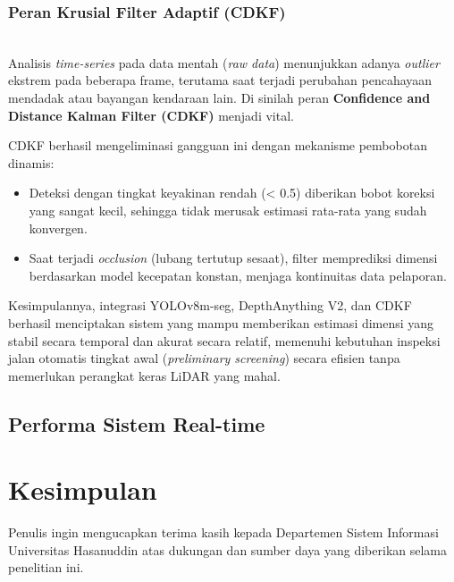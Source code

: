 \documentclass{iopjournal}
\begin{document}
\subsubsection{Peran Krusial Filter Adaptif (CDKF)}
\mbox{}\\
Analisis \textit{time-series} pada data mentah (\textit{raw data}) menunjukkan adanya \textit{outlier} ekstrem pada beberapa frame, terutama saat terjadi perubahan pencahayaan mendadak atau bayangan kendaraan lain. Di sinilah peran \textbf{Confidence and Distance Kalman Filter (CDKF)} menjadi vital.

CDKF berhasil mengeliminasi gangguan ini dengan mekanisme pembobotan dinamis:
\begin{itemize}
    \item Deteksi dengan tingkat keyakinan rendah (< 0.5) diberikan bobot koreksi yang sangat kecil, sehingga tidak merusak estimasi rata-rata yang sudah konvergen.
    \item Saat terjadi \textit{occlusion} (lubang tertutup sesaat), filter memprediksi dimensi berdasarkan model kecepatan konstan, menjaga kontinuitas data pelaporan.
\end{itemize}

Kesimpulannya, integrasi YOLOv8m-seg, DepthAnything V2, dan CDKF berhasil menciptakan sistem yang mampu memberikan estimasi dimensi yang stabil secara temporal dan akurat secara relatif, memenuhi kebutuhan inspeksi jalan otomatis tingkat awal (\textit{preliminary screening}) secara efisien tanpa memerlukan perangkat keras LiDAR yang mahal.

\subsection{Performa Sistem Real-time}

\section{Kesimpulan}
\label{sec:conclusion}

\ack
Penulis ingin mengucapkan terima kasih kepada Departemen Sistem Informasi Universitas Hasanuddin atas dukungan dan sumber daya yang diberikan selama penelitian ini.
\end{document}
